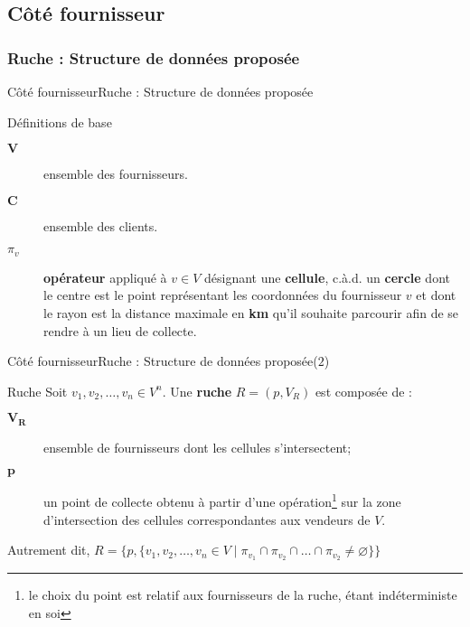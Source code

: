\documentclass[usenames,dvipsnames]{beamer}
\begin{document}
\subsection{Côté fournisseur}
\subsubsection*{Ruche : Structure de données proposée}
\begin{frame}{Côté fournisseur}{Ruche : Structure de données proposée}
\begin{block}{Définitions de base}
\begin{description}
  \item[$\textbf{V}$]{ensemble des fournisseurs.}
  \item[$\textbf{C}$]{ensemble des clients.}
  \item[$\pi_v$]{\textbf{opérateur} appliqué à $v \in V$ désignant une \textbf{cellule}, c.à.d. un \textbf{cercle} dont le centre est le point représentant les coordonnées du fournisseur $v$ et dont le rayon est la distance maximale en \textbf{km} qu'il souhaite parcourir afin de se rendre à un lieu de collecte.}
\end{description}
\end{block}
\end{frame}

\begin{frame}{Côté fournisseur}{Ruche : Structure de données proposée($2$)}
\begin{block}{Ruche}
Soit $v_1, v_2, \dots, v_n \in V^n$. Une \textbf{ruche} $R = (p, V_R)$ est composée de :
\begin{description}
  \item[$\mathbf{V_R}$]{ensemble de fournisseurs dont les cellules s'intersectent;}
  \item[$\mathbf{p}$]{un point de collecte obtenu à partir d'une opération\footnote{le choix du point est relatif aux fournisseurs de la ruche, étant indéterministe en soi} sur la zone d'intersection des cellules correspondantes aux vendeurs de $V$.}
\end{description}
Autrement dit, $R = \{p, \{v_1, v_2, \dots, v_n \in V\; |\; \pi_{v_1} \cap \pi_{v_2} \cap \dots \cap \pi_{v_2} \neq \varnothing\}\}$
\end{block}
\end{frame}
\end{document}
